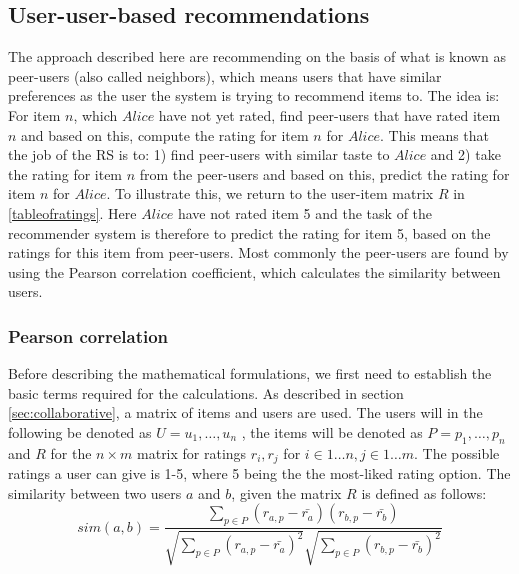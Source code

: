 \subsection{User-user-based recommendations} %
\label{sub:user_user_based_recommendations}
The approach described here are recommending on the basis of what is known as peer-users (also called neighbors), which means users that have similar preferences as the user the system is trying to recommend items to. The idea is: For item \(n\), which \(Alice\) have not yet rated, find peer-users that have rated item \(n\) and based on this, compute the rating for item \(n\) for \(Alice\). This means that the job of the RS is to: 1) find peer-users with similar taste to \(Alice\) and 2) take the rating for item \(n\) from the peer-users and based on this, predict the rating for item \(n\) for \(Alice\).\newline
To illustrate this, we return to the user-item matrix \(R\) in \ref{tableofratings}. Here \(Alice\) have not rated item 5 and the task of the recommender system is therefore to predict the rating for item 5, based on the ratings for this item from peer-users. Most commonly the peer-users are found by using the Pearson correlation coefficient\citep{IntroductionRecommenderSystems}, which calculates the similarity between users.

\subsubsection{Pearson correlation}
Before describing the mathematical formulations, we first need to establish the basic terms required for the calculations. As described in section \ref{sec:collaborative}, a matrix of items and users are used. The users will in the following be denoted as \( U = {u_{1}, \ldots , u_{n}} \) , the items will be denoted as \( P = {p_{1}, \ldots , p_{n}} \) and \(R\) for the \({n \times m}\) matrix for ratings \(r_{i}, r_{j}\) for \(i \in 1 \ldots n, j \in 1 \ldots m\). The possible ratings a user can give is 1-5, where 5 being the the most-liked rating option. 
The similarity between two users \(a\) and \(b\), given the matrix \(R\) is defined as follows:\\

\[
	sim(a,b) = \frac{\sum_{p\in P} (r_{a,p} - \bar{r_{a}})(r_{b,p} - \bar{r_{b}})}{\sqrt{\sum_{p\in P} (r_{a,p} - \bar{r_{a}})^2} \sqrt{\sum_{p\in P} (r_{b,p} - \bar{r_{b}})^2}}
\]


